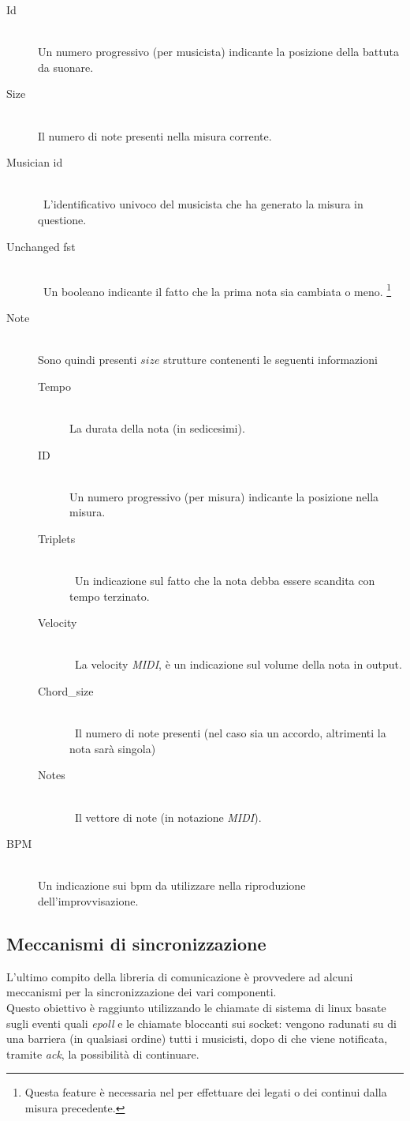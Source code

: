 \begin{description}
\item[Id] \hfill \\
Un numero progressivo (per musicista) indicante la posizione della battuta da suonare.
\item[Size] \hfill \\
Il numero di note presenti nella misura corrente.
\item[Musician id] \hfill \\\
L'identificativo univoco del musicista che ha generato la misura in questione.
\item[Unchanged fst] \hfill \\\
Un booleano indicante il fatto che la prima nota sia cambiata o meno.
\footnote{Questa feature \`e necessaria nel per effettuare dei legati
	  o dei continui dalla misura precedente.}
\item[Note] \hfill \\
Sono quindi presenti $size$ strutture contenenti le seguenti informazioni
\begin{description}
\item[Tempo] \hfill \\
La durata della nota (in sedicesimi).
\item[ID] \hfill \\
Un numero progressivo (per misura) indicante la posizione nella misura.
\item[Triplets] \hfill \\\
Un indicazione sul fatto che la nota debba essere scandita con tempo terzinato.
\item[Velocity] \hfill \\\
La velocity \emph{MIDI}, \`e un indicazione sul volume della nota in output.
\item[Chord\_size] \hfill \\\
Il numero di note presenti (nel caso sia un accordo,
altrimenti la nota sarà singola)
\item[Notes] \hfill \\\
Il vettore di note (in notazione \emph{MIDI}).
\end{description}
\item[BPM] \hfill \\
Un indicazione sui bpm da utilizzare nella riproduzione dell'improvvisazione.
\end{description}

\subsection{Meccanismi di sincronizzazione}
L'ultimo compito della libreria di comunicazione è
provvedere ad alcuni meccanismi per la sincronizzazione dei vari componenti.\\
Questo obiettivo è raggiunto utilizzando le chiamate di sistema di linux basate
sugli eventi quali \emph{epoll} e le chiamate bloccanti sui socket: vengono radunati su di una barriera
(in qualsiasi ordine) tutti i musicisti, dopo di che viene notificata, tramite
\emph{ack}, la possibilità di continuare.
